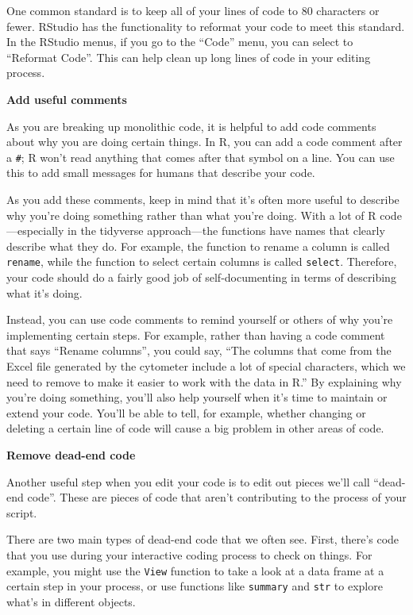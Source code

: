 \documentclass[]{tufte-book}
\begin{document}
One common standard is to keep all of your lines of code to 80 characters or
fewer. RStudio has the functionality to reformat your code to meet this
standard. In the RStudio menus, if you go to the ``Code'' menu, you can select
to ``Reformat Code''. This can help clean up long lines of code in your editing
process.

\textbf{Add useful comments}

As you are breaking up monolithic code, it is helpful to add code comments about
why you are doing certain things. In R, you can add a code comment after a \texttt{\#};
R won't read anything that comes after that symbol on a line. You can use this
to add small messages for humans that describe your code.

As you add these comments, keep in mind that it's often more useful to describe
why you're doing something rather than what you're doing. With a lot of R
code---especially in the tidyverse approach---the functions have names that
clearly describe what they do. For example, the function to rename a column is
called \texttt{rename}, while the function to select certain columns is called
\texttt{select}. Therefore, your code should do a fairly good job of self-documenting
in terms of describing what it's doing.

Instead, you can use code comments to remind yourself or others of
why you're implementing certain steps. For example, rather than having a code
comment that says ``Rename columns'', you could say, ``The columns that come
from the Excel file generated by the cytometer include a lot of special
characters, which we need to remove to make it easier to work with the data in
R.'' By explaining why you're doing something, you'll also help yourself when it's
time to maintain or extend your code. You'll be able to tell, for example,
whether changing or deleting a certain line of code will cause a big problem
in other areas of code.

\textbf{Remove dead-end code}

Another useful step when you edit your code is to edit out pieces we'll call
``dead-end code''. These are pieces of code that aren't contributing to the
process of your script.

There are two main types of dead-end code that we often see. First, there's
code that you use during your interactive coding process to check on things. For
example, you might use the \texttt{View} function to take a look at a data frame at a
certain step in your process, or use functions like \texttt{summary} and \texttt{str} to
explore what's in different objects.
\end{document}
